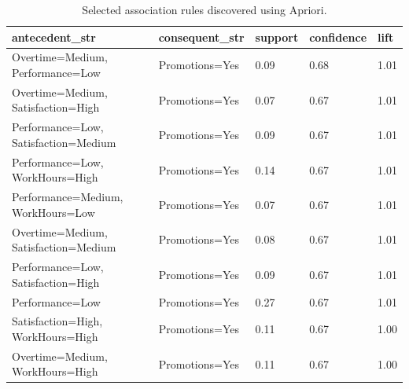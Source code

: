 \begin{table}
\caption{Selected association rules discovered using Apriori.}
\label{tab:apriori_rules}
\begin{tabular}{lllll}
\toprule
antecedent\_str & consequent\_str & support & confidence & lift \\
\midrule
Overtime=Medium, Performance=Low & Promotions=Yes & 0.09 & 0.68 & 1.01 \\
Overtime=Medium, Satisfaction=High & Promotions=Yes & 0.07 & 0.67 & 1.01 \\
Performance=Low, Satisfaction=Medium & Promotions=Yes & 0.09 & 0.67 & 1.01 \\
Performance=Low, WorkHours=High & Promotions=Yes & 0.14 & 0.67 & 1.01 \\
Performance=Medium, WorkHours=Low & Promotions=Yes & 0.07 & 0.67 & 1.01 \\
Overtime=Medium, Satisfaction=Medium & Promotions=Yes & 0.08 & 0.67 & 1.01 \\
Performance=Low, Satisfaction=High & Promotions=Yes & 0.09 & 0.67 & 1.01 \\
Performance=Low & Promotions=Yes & 0.27 & 0.67 & 1.01 \\
Satisfaction=High, WorkHours=High & Promotions=Yes & 0.11 & 0.67 & 1.00 \\
Overtime=Medium, WorkHours=High & Promotions=Yes & 0.11 & 0.67 & 1.00 \\
\bottomrule
\end{tabular}
\end{table}
